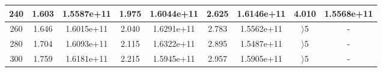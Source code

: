 \documentclass{article}
\begin{document}
\begin{table}[H]
\begin{tabular}{|c|cc|cc|cc|cc|}
    240                                             & \multicolumn{1}{c|}{1.603}                                           & 1.5587e+11                                           & \multicolumn{1}{c|}{1.975}                                           & 1.6044e+11                                           & \multicolumn{1}{c|}{2.625}                                           & 1.6146e+11                                           & \multicolumn{1}{c|}{4.010}                                           & 1.5568e+11                                           \\ \hline
    260                                             & \multicolumn{1}{c|}{1.646}                                           & 1.6015e+11                                           & \multicolumn{1}{c|}{2.040}                                           & 1.6291e+11                                           & \multicolumn{1}{c|}{2.783}                                           & 1.5562e+11                                           & \multicolumn{1}{c|}{\color[HTML]{FE0000} $\rangle$5}                 & -                                                    \\ \hline
    280                                             & \multicolumn{1}{c|}{1.704}                                           & 1.6093e+11                                           & \multicolumn{1}{c|}{2.115}                                           & 1.6322e+11                                           & \multicolumn{1}{c|}{2.895}                                           & 1.5487e+11                                           & \multicolumn{1}{c|}{\color[HTML]{FE0000} $\rangle$5}                 & -                                                    \\ \hline
    300                                             & \multicolumn{1}{c|}{1.759}                                           & 1.6181e+11                                           & \multicolumn{1}{c|}{2.215}                                           & 1.5945e+11                                           & \multicolumn{1}{c|}{2.957}                                           & 1.5905e+11                                           & \multicolumn{1}{c|}{\color[HTML]{FE0000} $\rangle$5}                 & -                                                    \\ \hline
    \end{tabular}
    \end{table}
\raggedright
\end{document}
